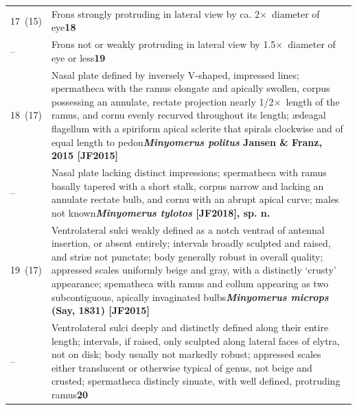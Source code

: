 \documentclass[fleqn,10pt,lineno]{wlpeerj} %
\newcommand{\x}{$\times$~}
\newcommand{\breakfill}{\dotfill\newline\penalty0\hbox{}\nobreak\dotfill}
\begin{document}
\begin{xtabular}{@{}
                p{\dimexpr.1\textwidth-\tabcolsep\relax}
                p{\dimexpr.9\textwidth-\tabcolsep\relax}@{}}
		{17~(15)} & {Frons strongly protruding in lateral view by ca. 2\x diameter of eye}{\dotfill}{\textbf{18}}\\
		{--} & {Frons not or weakly protruding in lateral view by 1.5\x diameter of eye or less}{\dotfill}{\textbf{19}}\\
		
		{18~(17)} & {Nasal plate defined by inversely V-shaped, impressed lines; spermatheca with the ramus elongate and apically swollen, corpus possessing an annulate, rectate projection nearly 1/2\x length of the ramus, and cornu evenly recurved throughout its length; {\ae}deagal flagellum with a spiriform apical sclerite that spirals clockwise and of equal length to pedon}{\breakfill}{\textbf{\textit{Minyomerus politus} Jansen \& Franz, 2015 [JF2015]}}\\
		{--} & {Nasal plate lacking distinct impressions; spermatheca with ramus basally tapered with a short stalk, corpus narrow and lacking an annulate rectate bulb, and cornu with an abrupt apical curve; males not known}{\dotfill}{\textbf{\textit{Minyomerus tylotos} [JF2018], sp. n.}}\\		
		
		{19~(17)} & {Ventrolateral sulci weakly defined as a notch ventrad of antennal insertion, or absent entirely; intervals broadly sculpted and raised, and stri{\ae} not punctate; body generally robust in overall quality; appressed scales uniformly beige and gray, with a
distinctly ‘crusty’ appearance; spematheca with ramus and collum appearing
as two subcontiguous, apically invaginated bulbs}{\dotfill}{\textbf{\textit{Minyomerus microps} (Say, 1831) [JF2015]}}\\
		{--} & {Ventrolateral sulci deeply and distinctly defined along their entire length; intervals, if raised, only sculpted along lateral faces of elytra, not on disk; body usually not markedly robust; appressed scales either translucent or otherwise typical of genus, not beige and crusted; spermatheca distincly sinuate, with well defined, protruding ramus}{\dotfill}{\textbf{20}}\\
		

\end{xtabular}
\end{document}
